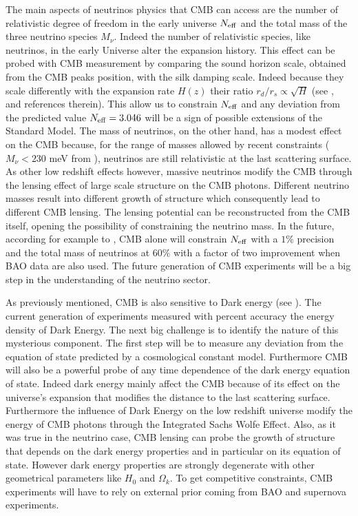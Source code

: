 \documentclass[aps,prd,preprint,groupedaddress]{revtex4-1}
\begin{document}
The main aspects of neutrinos physics that CMB can access are the number of relativistic degree of freedom in the early universe $N_{\rm eff}$ and the total mass of the three neutrino species $M_{\nu}$.
Indeed the number of relativistic species, like neutrinos, in the early Universe alter the expansion history. This effect can be probed with CMB measurement by comparing the sound horizon scale, obtained from the CMB peaks position, with the silk damping scale. Indeed because they scale differently with the expansion rate $H(z)$ their ratio $r_{d}/r_{s}\propto\sqrt{H}$ (see \cite{2013arXiv1309.5383A}, \cite{2013PhRvD..87h3008H} and references therein). 
This allow us to constrain $N_{\rm eff}$ and any deviation from the predicted value $N_{\rm eff}=3.046$ will be a sign of possible extensions of the Standard Model.
The mass of neutrinos, on the other hand, has a modest effect on the CMB because, for the range of masses allowed by recent constraints ($M_{\nu}<230$ meV from \cite{2014A&A...571A..16P}), neutrinos are still relativistic at the last scattering surface. As other low redshift effects however, massive neutrinos modify the CMB through the lensing effect of large scale structure on the CMB photons. Different neutrino masses result into different growth of structure which consequently lead to different CMB lensing. The lensing potential can be reconstructed from the CMB itself, opening the possibility of constraining the neutrino mass. 
In the future, according for example to \cite{wu:2014}, CMB alone will constrain $N_{\rm eff}$ with a $1\%$ precision and the total mass of neutrinos at $60\%$ with a factor of two improvement when BAO data are also used. The future generation of CMB experiments will be a big step in the understanding of the neutrino sector.

As previously mentioned, CMB is also sensitive to Dark energy (see \cite{2010MNRAS.405.2639J}). The current generation of experiments measured with percent accuracy the energy density of Dark Energy. The next big challenge is to identify the nature of this mysterious component. The first step will be to measure any deviation from the equation of state predicted by a cosmological constant model. Furthermore CMB will also be a powerful probe of any time dependence of the dark energy equation of state.
Indeed dark energy mainly affect the CMB because of its effect on the universe's expansion that modifies the distance to the last scattering surface. Furthermore the influence of Dark Energy on the low redshift universe modify the energy of CMB photons through the Integrated Sachs Wolfe Effect. Also, as it was true in the neutrino case, CMB lensing can probe the growth of structure that depends on the dark energy properties and in particular on its equation of state. However dark energy properties are strongly degenerate with other geometrical parameters like $H_{0}$ and $\Omega_{k}$. To get competitive constraints, CMB experiments will have to rely on external prior coming from BAO and supernova experiments.
\end{document}

